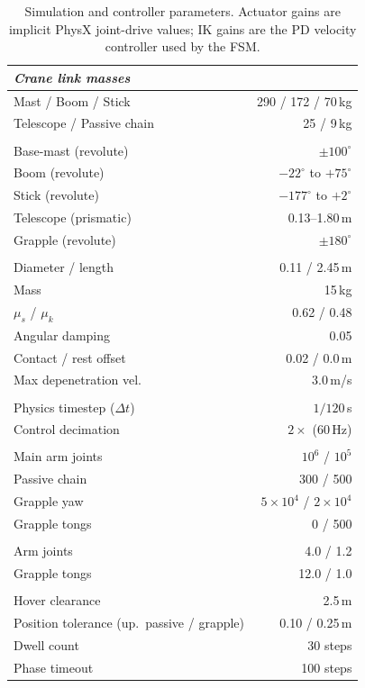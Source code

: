 \documentclass[letterpaper, 10 pt, conference]{ieeeconf}
\begin{document}
\begin{table}[t]
\centering
\caption{Simulation and controller parameters. Actuator gains are implicit PhysX joint-drive values; IK gains are the PD velocity controller used by the FSM.}
\label{tab:sim_params}
\scriptsize
\begin{tabular}{@{}lr@{}}
\toprule
\multicolumn{2}{l}{\textbf{\textit{Crane link masses}}} \\
\midrule
Mast / Boom / Stick & 290 / 172 / 70\,kg \\
Telescope / Passive chain & 25 / 9\,kg \\
\addlinespace[2pt]
\multicolumn{2}{l}{\textbf{\textit{Joint limits}}} \\
\midrule
Base-mast (revolute) & $\pm100^{\circ}$ \\
Boom (revolute) & $-22^{\circ}$ to $+75^{\circ}$ \\
Stick (revolute) & $-177^{\circ}$ to $+2^{\circ}$ \\
Telescope (prismatic) & 0.13--1.80\,m \\
Grapple (revolute) & $\pm180^{\circ}$ \\
\addlinespace[2pt]
\multicolumn{2}{l}{\textbf{\textit{Log properties}}} \\
\midrule
Diameter / length & 0.11 / 2.45\,m \\
Mass & 15\,kg \\
$\mu_s$ / $\mu_k$ & 0.62 / 0.48 \\
Angular damping & 0.05 \\
Contact / rest offset & 0.02 / 0.0\,m \\
Max depenetration vel. & 3.0\,m/s \\
\addlinespace[2pt]
\multicolumn{2}{l}{\textbf{\textit{Simulation}}} \\
\midrule
Physics timestep ($\Delta t$) & $1/120$\,s \\
Control decimation & $2\times$ (60\,Hz) \\
\addlinespace[2pt]
\multicolumn{2}{l}{\textbf{\textit{Actuator gains}} ($k_p$ / $k_d$)} \\
\midrule
Main arm joints & $10^{6}$ / $10^{5}$ \\
Passive chain & 300 / 500 \\
Grapple yaw & $5\!\times\!10^{4}$ / $2\!\times\!10^{4}$ \\
Grapple tongs & 0 / 500 \\
\addlinespace[2pt]
\multicolumn{2}{l}{\textbf{\textit{IK PD gains}} ($k_p$ / $k_d$)} \\
\midrule
Arm joints & 4.0 / 1.2 \\
Grapple tongs & 12.0 / 1.0 \\
\addlinespace[2pt]
\multicolumn{2}{l}{\textbf{\textit{FSM parameters}}} \\
\midrule
Hover clearance & 2.5\,m \\
Position tolerance (up.\ passive / grapple) & 0.10 / 0.25\,m \\
Dwell count & 30 steps \\
Phase timeout & 100 steps \\
\bottomrule
\end{tabular}
\end{table}
\end{document}
